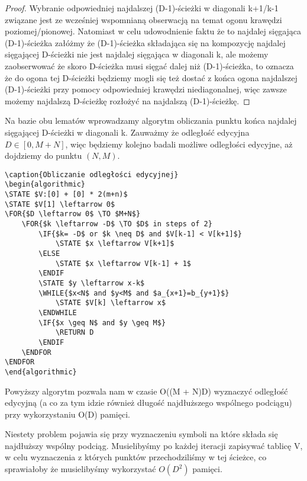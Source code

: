 \begin{proof}
Wybranie odpowiedniej najdalszej (D-1)-ścieżki w diagonali k+1/k-1 związane jest ze wcześniej wspomnianą obserwacją na temat ogonu krawędzi poziomej/pionowej. Natomiast w celu udowodnienie faktu że to najdalej sięgająca (D-1)-ścieżka załóżmy że (D-1)-ścieżka składająca się na kompozycję najdalej sięgającej D-ścieżki nie jest najdalej sięgająca w diagonali k, ale możemy zaobserwować że skoro D-ścieżka musi sięgać dalej niż (D-1)-ścieżka, to oznacza że do ogona tej D-ścieżki będziemy mogli się też dostać z końca ogona najdalszej (D-1)-ścieżki przy pomocy odpowiedniej krawędzi niediagonalnej, więc zawsze możemy najdalszą D-ścieżkę rozłożyć na najdalszą (D-1)-ścieżkę.
\end{proof}

Na bazie obu lematów wprowadzamy algorytm obliczania punktu końca najdalej sięgającej D-ścieżki w diagonali k. Zauważmy że odległość edycyjna $D \in [0, M+N]$, więc będziemy kolejno badali możliwe odległości edycyjne, aż dojdziemy do punktu $(N,M)$.

\begin{verbatim}
\caption{Obliczanie odległości edycyjnej}
\begin{algorithmic}
\STATE $V:[0] + [0] * 2(m+n)$
\STATE $V[1] \leftarrow 0$
\FOR{$D \leftarrow 0$ \TO $M+N$}
    \FOR{$k \leftarrow -D$ \TO $D$ in steps of 2}
        \IF{$k= -D$ or $k \neq D$ and $V[k-1] < V[k+1]$}
            \STATE $x \leftarrow V[k+1]$
        \ELSE
            \STATE $x \leftarrow V[k-1] + 1$
        \ENDIF
        \STATE $y \leftarrow x-k$
        \WHILE{$x<N$ and $y<M$ and $a_{x+1}=b_{y+1}$}
            \STATE $V[k] \leftarrow x$ 
        \ENDWHILE
        \IF{$x \geq N$ and $y \geq M$}
            \RETURN D
        \ENDIF
    \ENDFOR
\ENDFOR
\end{algorithmic}
\end{verbatim}

\vspace{5mm}

Powyższy algorytm pozwala nam w czasie O((M + N)D) wyznaczyć odległość edycyjną (a co za tym idzie również długość najdłuższego wspólnego podciągu) przy wykorzystaniu O(D) pamięci.

Niestety problem pojawia się przy wyznaczeniu symboli na które składa się najdłuższy wspólny podciąg. Musielibyśmy po każdej iteracji zapisywać tablicę V, w celu wyznaczenia z których punktów przechodziliśmy w tej ścieżce, co sprawiałoby że musielibyśmy wykorzystać $O(D^2)$ pamięci.

